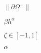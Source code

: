 \documentclass{article}
\begin{document}
$\| \partial\Omega^- \|$
\pagebreak

$ \beta h^\alpha $
\pagebreak

$\zeta \in [-1,1]$
\pagebreak

$ \alpha $
\pagebreak
\end{document}
